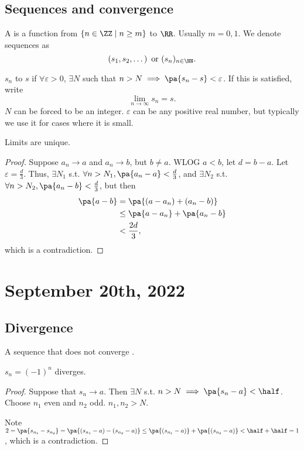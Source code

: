 \documentclass[11pt]{scrartcl}
\numberwithin{equation}{section}
\begin{document}
\subsection{Sequences and convergence}
\begin{definition}
    A  is a function from 
    $\left\{n \in\ZZ\mid n\geq m\right\}$ to $\RR$.
    Usually $m=0,1$. We denote sequences as 
    \[ \left(s_1,s_2,\dots\right) \text{ or } (s_n)_{n\in\NN}.\]
\end{definition}
\begin{definition}
    $s_n$  to $s$ if $\forall\varepsilon > 0$,
    $\exists N$ such that $n>N \implies \pa{s_n-s} < \varepsilon$.
    If this is satisfied, write 
    \[ 
        \lim_{n\rightarrow\infty} s_n = s. 
    \]
    $N$ can be forced to be an integer.
    $\varepsilon$ can be any positive real number, but typically we use 
    it for cases where it is small.
\end{definition}
\begin{proposition}
    Limits are unique. 
\end{proposition}
\begin{proof}
    Suppose $a_n \rightarrow a$ and $a_n\rightarrow b$, but $b\neq a$.
    WLOG $a<b$, let $d=b-a$. Let 
    $\varepsilon = \frac{d}{3}$. Thus, $\exists N_1$ s.t. 
    $\forall n>N_1, \pa{a_n-a} < \frac{d}{3}$, and $\exists N_2$ s.t. 
    $\forall n>N_2, \pa{a_n-b} < \frac{d}{3}$, but then 
    \begin{align*}
        \pa{a-b} &= \pa{(a-a_n)+ (a_n-b)} \\
        &\leq  \pa{a-a_n} + \pa{a_n-b} \\ 
        &< \frac{2d}{3}, 
    \end{align*}
    which is a contradiction.
\end{proof}
\clearpage
\section{September 20th, 2022}
\subsection{Divergence}
A sequence that does not converge .
\begin{example}
    $s_n = (-1)^n$ diverges.
    \begin{proof}
        Suppose that $s_n\rightarrow a$. Then 
        $\exists N$ s.t. $n>N\implies \pa{s_n-a}<\half$.
        Choose $n_1$ even and $n_2$ odd. $n_1,n_2>N$.
    
        Note $2=\pa{s_{n_1} - s_{n_2}} = \pa{(s_{n_1} - a) - (s_{n_2} - a)}
        \leq \pa{(s_{n_1} - a)} + \pa{(s_{n_2} - a)} < \half + \half = 1$,
        which is a contradiction.
    \end{proof}
\end{example}
\end{document}
